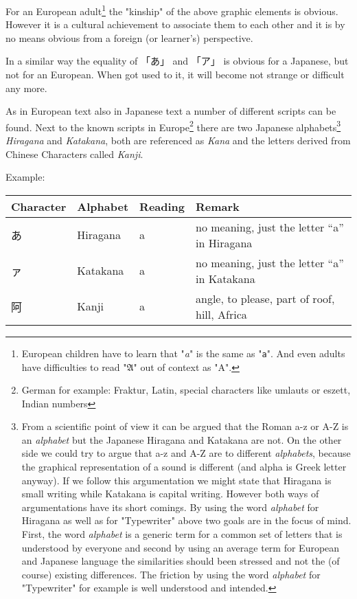 For an European adult\footnote{European children have to learn that
"\textit{a}" is the same as "\texttt{a}". And even adults have difficulties to
read "$\mathfrak{A}$" out of context as "A".}  the "kinship" of the above
graphic elements is obvious. However it is a cultural achievement to associate
them to each other and it is by no means obvious from a foreign (or learner's)
perspective. 

In a similar way the equality of {「あ」} and {「ア」} is obvious for a
Japanese, but not for an European. When got used to it, it will become not
strange or difficult any more.

As in European text also in Japanese text a number of different scripts can be
found. Next to the known scripts in Europe\footnote{German for example:
Fraktur, Latin, special characters like umlauts or eszett, Indian numbers}
there are two Japanese alphabets\footnote{ From a scientific point of view it
can be argued that the Roman a-z or A-Z is an \textit{alphabet} but the
Japanese Hiragana and Katakana are not. On the other side we could try to argue
that a-z and A-Z are to different \textit{alphabets}, because the graphical
representation of a sound is different (and alpha is Greek letter anyway). If
we follow this argumentation we might state that Hiragana is small writing
while Katakana is capital writing. However both ways of argumentations have its
short comings. By using the word \textit{alphabet} for Hiragana as well as for
"Typewriter" above two goals are in the focus of mind. First, the word
\textit{alphabet} is a generic term for a common set of letters that is
understood by everyone and second by using an average term for European and
Japanese language the similarities should been stressed and not the (of course)
existing differences. The friction by using the word \textit{alphabet} for
"Typewriter" for example is well understood and intended. } \textit{Hiragana}
and \textit{Katakana}, both are referenced as \textit{Kana} and the letters
derived from Chinese Characters called \textit{Kanji}.

Example:

\begin{center}
\begin{tabular}{|l|l|l|l|}
\textbf{Character}&\textbf{Alphabet}&\textbf{Reading}&\textbf{Remark}\\\hline
あ& Hiragana & a & no meaning, just the letter  ``a'' in Hiragana \\
ァ& Katakana & a & no meaning, just the letter ``a'' in Katakana \\
阿& Kanji    & a & { angle, to please, part of roof, hill, Africa}\\
\end{tabular}
\end{center}

